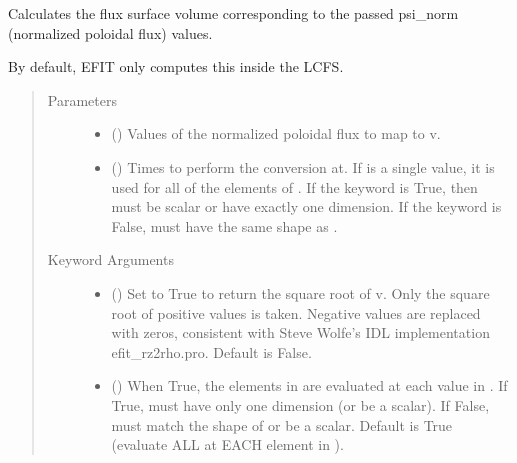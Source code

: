 \documentclass[letterpaper,10pt,english]{sphinxmanual}
\begin{document}
\begin{fulllineitems}
\begin{fulllineitems}
\label{\detokenize{eqtools:eqtools.core.Equilibrium.psinorm2v}}
Calculates the flux surface volume corresponding to the passed psi\_norm (normalized poloidal flux) values.

By default, EFIT only computes this inside the LCFS.
\begin{quote}\begin{description}
\item[{Parameters}] \leavevmode\begin{itemize}
\item {} 
 () \textendash{} Values of the normalized
poloidal flux to map to v.

\item {} 
 () \textendash{} Times to perform the conversion at.
If  is a single value, it is used for all of the elements of
. If the  keyword is True, then  must be scalar
or have exactly one dimension. If the  keyword is False,
 must have the same shape as .

\end{itemize}

\item[{Keyword Arguments}] \leavevmode\begin{itemize}
\item {} 
 () \textendash{} Set to True to return the square root of v. Only
the square root of positive values is taken. Negative values are
replaced with zeros, consistent with Steve Wolfe’s IDL
implementation efit\_rz2rho.pro. Default is False.

\item {} 
 () \textendash{} When True, the elements in  are evaluated at
each value in . If True,  must have only one dimension (or
be a scalar). If False,  must match the shape of  or be
a scalar. Default is True (evaluate ALL  at EACH element in
).


\end{itemize}
\end{description}
\end{quote}
\end{fulllineitems}
\end{fulllineitems}
\end{document}
